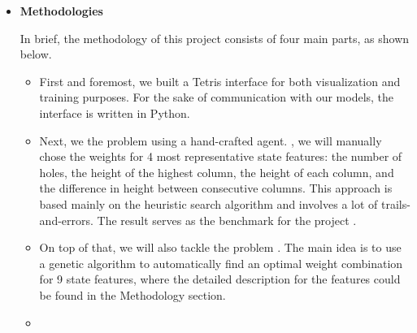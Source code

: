 \documentclass[letterpaper]{article} %
\begin{document}
\begin{itemize}
\item 
{\bf Methodologies}

In brief, the methodology of this project consists of four main parts, as shown below.
\begin{itemize}
  \item 
  First and foremost, we built a Tetris interface for both visualization and training purposes. For the sake of communication with our models, the interface is written in Python. 
  \item 
  Next, we  the problem using a hand-crafted agent.  \cite{Bertsekas_1996}, we will manually chose the weights for 4 most representative state features: the number of holes, the height of the highest column, the height of each column, and the difference in height between consecutive columns. This approach is based mainly on the heuristic search algorithm and involves a lot of trails-and-errors. The result serves as the benchmark for the project .
  \item 
  On top of that, we will also tackle the problem . The main idea is to use a genetic algorithm to automatically find an optimal weight combination for 9 state features, where the detailed description for the features could be found in the Methodology section. 
  
  \item {}


\end{itemize}
\end{itemize}
\end{document}
